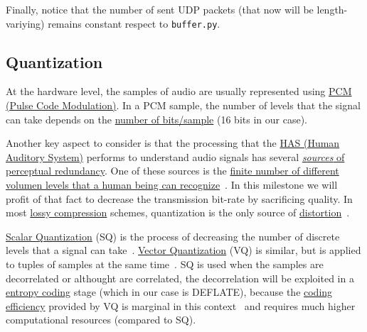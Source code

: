 Finally, notice that the number of sent UDP packets (that now will be
length-variying) remains constant respect to \verb|buffer.py|.

\subsection{Quantization}
At the hardware level, the samples of audio are usually represented
using \href{https://en.wikipedia.org/wiki/Pulse-code_modulation}{PCM
  (Pulse Code Modulation)}. In a PCM sample, the number of levels that
the signal can take depends on the
\href{https://en.wikipedia.org/wiki/Audio_bit_depth}{number of
  bits/sample} (16 bits in our case).

Another key aspect to consider is that the processing that the
\href{https://en.wikipedia.org/wiki/Auditory_system}{HAS (Human
  Auditory System)} performs to understand audio signals has several
\href{https://en.wikipedia.org/wiki/Psychoacoustics}{\emph{sources} of
  perceptual redundancy}. One of these sources is the
\href{https://en.wikipedia.org/wiki/Equal-loudness_contour}{finite
  number of different volumen levels that a human being can
  recognize}~\cite{bosi2003intro}. In this milestone we will profit of
that fact to decrease the transmission bit-rate by sacrificing
quality. In most
\href{https://en.wikipedia.org/wiki/Lossy_compression}{lossy
  compression} schemes, quantization is the only source of
\href{https://en.wikipedia.org/wiki/Distortion}{distortion}~\cite{taubman2002jpeg2000}.

\href{https://en.wikipedia.org/wiki/Quantization_(signal_processing)}{Scalar
  Quantization} (SQ) is the process of decreasing the number of
discrete levels that a signal can
take~\cite{sayood2017introduction}. \href{https://en.wikipedia.org/wiki/Vector_quantization}{Vector
  Quantization} (VQ) is similar, but is applied to tuples of samples
at the same time~\cite{vetterli2014foundations}. SQ is used when the
samples are decorrelated or althought are correlated, the
decorrelation will be exploited in a
\href{https://en.wikipedia.org/wiki/Entropy_encoding}{entropy coding}
stage (which in our case is DEFLATE), because the
\href{https://en.wikipedia.org/wiki/Quantization_(signal_processing)#Rate%E2%80%93distortion_optimization}{coding
  efficiency} provided by VQ is marginal in this
context~\cite{vetterli2014foundations} and requires much higher
computational resources (compared to SQ).


